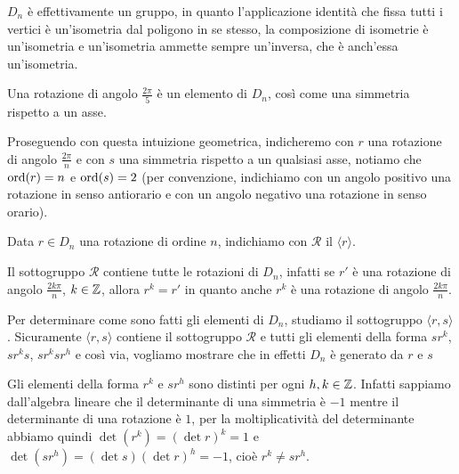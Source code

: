 \documentclass[11pt]{scrartcl}
\begin{document}
\begin{remark}
    $D_n$ è effettivamente un gruppo, in quanto l'applicazione identità che 
    fissa tutti i vertici è un'isometria dal poligono in se stesso, la 
    composizione di isometrie è un'isometria e un'isometria ammette sempre 
    un'inversa, che è anch'essa un'isometria.
\end{remark}

\begin{remark}
    Una rotazione di angolo $\displaystyle\frac{2\pi}{5}$ è un elemento di $D_n$,
    così come una simmetria rispetto a un asse.
\end{remark}

Proseguendo con questa intuizione geometrica, indicheremo con $r$ una rotazione
di angolo $\displaystyle \frac{2\pi}{n}$ e con $s$ una simmetria rispetto a
un qualsiasi asse, notiamo che $\operatorname{ord}(r) = n$ e $\operatorname{ord}(s) = 2$ (per convenzione, 
indichiamo con un angolo positivo una rotazione in senso antiorario e con un 
angolo negativo una rotazione in senso orario).

\begin{definition}
    Data $r \in D_n$ una rotazione di ordine $n$, indichiamo con $\mathcal{R}$ il
     $\langle r\rangle$.
\end{definition}

\begin{remark}
    Il sottogruppo $\mathcal{R}$ contiene tutte le rotazioni di $D_n$, infatti
    se $r'$ è una rotazione di angolo $\displaystyle\frac{2k\pi}{n}$, $k \in \mathbb Z$,
    allora $r^k = r'$ in quanto anche $r^k$ è una rotazione di angolo 
    $\displaystyle\frac{2k\pi}{n}$.
\end{remark}

Per determinare come sono fatti gli elementi di $D_n$, studiamo il sottogruppo
$\langle r, s\rangle$. Sicuramente $\langle r, s\rangle$ contiene il sottogruppo $\mathcal{R}$
e tutti gli elementi della forma $sr^k$, $sr^ks$, $sr^ksr^h$ e così via, vogliamo
mostrare che in effetti $D_n$ è generato da $r$ e $s$

\begin{remark}
    Gli elementi della forma $r^k$ e $sr^h$ sono distinti per ogni $h, k \in \mathbb Z$. 
    Infatti sappiamo dall'algebra lineare che il determinante di una simmetria
    è $-1$ mentre il determinante di una rotazione è $1$, per la moltiplicatività
    del determinante abbiamo quindi $\det (r^k) = (\det r)^k = 1$ e
    $\det (sr^h) = (\det s)(\det r)^h = -1$, cioè $r^k \neq sr^h$.
\end{remark}
\end{document}
